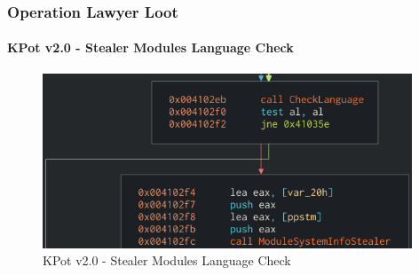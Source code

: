 \documentclass[aspectratio=169]{beamer}
\begin{document}
{
\begin{frame}
  \frametitle{Operation Lawyer Loot}
  \framesubtitle{KPot v2.0 - Stealer Modules Language Check}
  \begin{figure}
    \includegraphics[width=11cm]{kpot-stealer-modules-check-lang}
    \caption{KPot v2.0 - Stealer Modules Language Check}
  \end{figure}
\end{frame}
}
\end{document}
